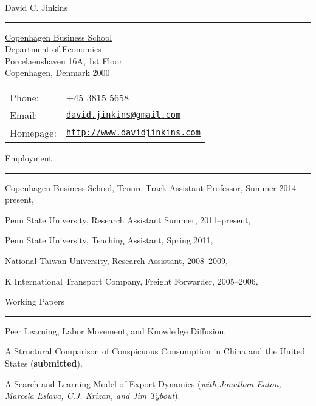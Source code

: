 \documentclass[letterpaper]{article}
\def\name{David C. Jinkins}
\renewenvironment{itemize}{
    \begin{list}{}{
            \setlength{\leftmargin}{1.5em}
            \setlength{\parskip}{0pt}
            \setlength{\parsep}{0pt}
        }
    }{
    \end{list}
}
\begin{document}
{\huge \name}
\hrule


\vspace{4mm}

\begin{minipage}{0.45\linewidth}
    \hspace*{5mm}\href{http://www.cbs.dk/}{Copenhagen Business School} \\
    \hspace*{5mm}Department of Economics \\
    \hspace*{5mm}Porcelaenshaven 16A, 1st Floor \\
    \hspace*{5mm}Copenhagen, Denmark 2000 
\end{minipage}
\begin{minipage}{0.45\linewidth}
    \begin{tabular}{ll}
        Phone: & +45 3815 5658 \\
        Email: & \href{mailto:david.jinkins@gmail.com}{\tt david.jinkins@gmail.com} \\
        Homepage: & \href{http://www.davidjinkins.com}{\tt http://www.davidjinkins.com} \\
    \end{tabular}
\end{minipage}

\vspace{7mm}
{\Large Employment}
\hrule
\begin{itemize}
    \item Copenhagen Business School, Tenure-Track Assistant Professor, Summer 2014--present,
    \item Penn State University, Research Assistant Summer, 2011--present,
    \item Penn State University, Teaching Assistant, Spring 2011,
    \item National Taiwan University, Research Assistant, 2008--2009,
    \item K International Transport Company, Freight Forwarder, 2005--2006,
\end{itemize}

\vspace{4mm}
{\Large Working Papers}
\vspace{1mm}
\hrule
\begin{itemize}
    \item Peer Learning, Labor Movement, and Knowledge Diffusion.
    \item A Structural Comparison of Conspicuous Consumption in China and the United States (\textbf{submitted}).
    \item A Search and Learning Model of Export Dynamics (\emph{with Jonathan Eaton, Marcela Eslava, C.J. Krizan, and Jim Tybout}).
\end{itemize}
\end{document}
